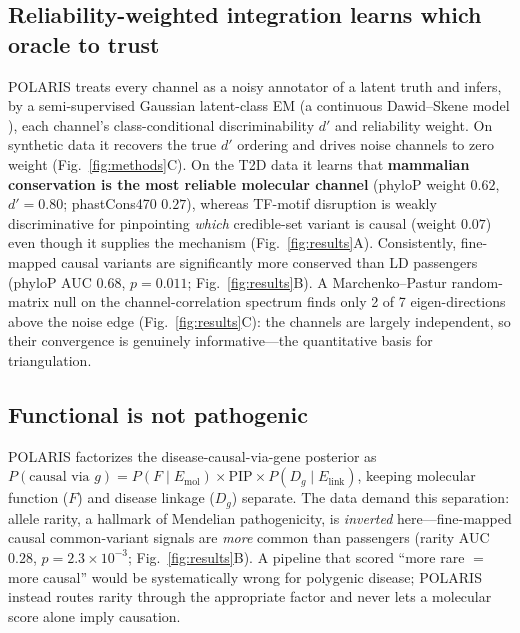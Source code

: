 \documentclass[10pt]{article}
\begin{document}
\subsection{Reliability-weighted integration learns which oracle to trust}
POLARIS treats every channel as a noisy annotator of a latent truth and infers, by a semi-supervised
Gaussian latent-class EM (a continuous Dawid--Skene model \citep{dawid1979em}), each channel's
class-conditional discriminability $d'$ and reliability weight. On synthetic data it recovers the true
$d'$ ordering and drives noise channels to zero weight (Fig.~\ref{fig:methods}C). On the T2D data it
learns that \textbf{mammalian conservation is the most reliable molecular channel} (phyloP weight $0.62$,
$d'=0.80$; phastCons470 $0.27$), whereas TF-motif disruption is weakly discriminative for pinpointing
\emph{which} credible-set variant is causal (weight $0.07$) even though it supplies the mechanism
(Fig.~\ref{fig:results}A). Consistently, fine-mapped causal variants are significantly more conserved
than LD passengers (phyloP AUC $0.68$, $p=0.011$; Fig.~\ref{fig:results}B). A Marchenko--Pastur
random-matrix null \citep{marchenko1967distribution} on the channel-correlation spectrum finds only
2 of 7 eigen-directions above the noise edge (Fig.~\ref{fig:results}C): the channels are largely
independent, so their convergence is genuinely informative---the quantitative basis for triangulation.

\subsection{Functional is not pathogenic}
POLARIS factorizes the disease-causal-via-gene posterior as
$P(\text{causal via }g)=P(F\mid E_{\text{mol}})\times\mathrm{PIP}\times P(D_g\mid E_{\text{link}})$,
keeping molecular function ($F$) and disease linkage ($D_g$) separate. The data demand this separation:
allele rarity, a hallmark of Mendelian pathogenicity, is \emph{inverted} here---fine-mapped causal
common-variant signals are \emph{more} common than passengers (rarity AUC $0.28$, $p=2.3\times10^{-3}$;
Fig.~\ref{fig:results}B). A pipeline that scored ``more rare $=$ more causal'' would be systematically
wrong for polygenic disease; POLARIS instead routes rarity through the appropriate factor and never lets
a molecular score alone imply causation.
\end{document}
